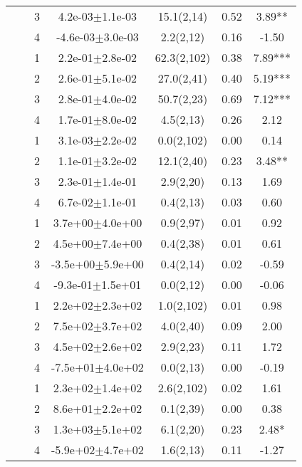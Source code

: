 \begin{longtable}{llccccS[table-format=-2.2, table-space-text-post = {***}]}
   &  & 3 &  4.2e-03$\pm$1.1e-03 & 15.1(2,14) & 0.52 & 3.89** \\ 
   &  & 4 & -4.6e-03$\pm$3.0e-03 & 2.2(2,12) & 0.16 & -1.50 \\ 
   \midrule
{} & {} & 1 &  2.2e-01$\pm$2.8e-02 & 62.3(2,102) & 0.38 & 7.89*** \\ 
   &  & 2 &  2.6e-01$\pm$5.1e-02 & 27.0(2,41) & 0.40 & 5.19*** \\ 
   &  & 3 &  2.8e-01$\pm$4.0e-02 & 50.7(2,23) & 0.69 & 7.12*** \\ 
   &  & 4 &  1.7e-01$\pm$8.0e-02 & 4.5(2,13) & 0.26 & 2.12 \\ 
   \midrule
{} & {} & 1 &  3.1e-03$\pm$2.2e-02 & 0.0(2,102) & 0.00 & 0.14 \\ 
   &  & 2 &  1.1e-01$\pm$3.2e-02 & 12.1(2,40) & 0.23 & 3.48** \\ 
   &  & 3 &  2.3e-01$\pm$1.4e-01 & 2.9(2,20) & 0.13 & 1.69 \\ 
   &  & 4 &  6.7e-02$\pm$1.1e-01 & 0.4(2,13) & 0.03 & 0.60 \\ 
   \midrule
{} & {} & 1 &  3.7e+00$\pm$4.0e+00 & 0.9(2,97) & 0.01 & 0.92 \\ 
   &  & 2 &  4.5e+00$\pm$7.4e+00 & 0.4(2,38) & 0.01 & 0.61 \\ 
   &  & 3 & -3.5e+00$\pm$5.9e+00 & 0.4(2,14) & 0.02 & -0.59 \\ 
   &  & 4 & -9.3e-01$\pm$1.5e+01 & 0.0(2,12) & 0.00 & -0.06 \\ 
   \midrule
{} & {} & 1 &  2.2e+02$\pm$2.3e+02 & 1.0(2,102) & 0.01 & 0.98 \\ 
   &  & 2 &  7.5e+02$\pm$3.7e+02 & 4.0(2,40) & 0.09 & 2.00 \\ 
   &  & 3 &  4.5e+02$\pm$2.6e+02 & 2.9(2,23) & 0.11 & 1.72 \\ 
   &  & 4 & -7.5e+01$\pm$4.0e+02 & 0.0(2,13) & 0.00 & -0.19 \\ 
   \midrule
{} & {} & 1 &  2.3e+02$\pm$1.4e+02 & 2.6(2,102) & 0.02 & 1.61 \\ 
   &  & 2 &  8.6e+01$\pm$2.2e+02 & 0.1(2,39) & 0.00 & 0.38 \\ 
   &  & 3 &  1.3e+03$\pm$5.1e+02 & 6.1(2,20) & 0.23 & 2.48* \\ 
   &  & 4 & -5.9e+02$\pm$4.7e+02 & 1.6(2,13) & 0.11 & -1.27 \\ 

\end{longtable}
